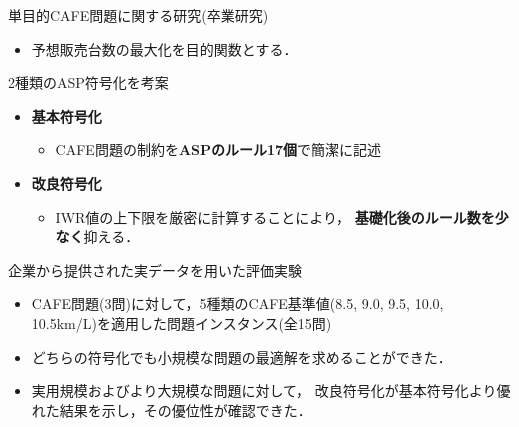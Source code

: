 \documentclass[dvipdfmx, 11pt]{beamer}
\begin{document}
\begin{frame}{単目的CAFE問題に関する研究(卒業研究)}
 \begin{itemize}
  \item 予想販売台数の最大化を目的関数とする．
 \end{itemize}
 \begin{block}{2種類のASP符号化を考案}
  \begin{itemize}
   \item {\bf 基本符号化}
	 \begin{itemize}
	  \item CAFE問題の制約を{\bf ASPのルール17個}で簡潔に記述
	 \end{itemize}
   \item {\bf 改良符号化}
	 \begin{itemize}
	  \item IWR値の上下限を厳密に計算することにより，
		{\bf 基礎化後のルール数を少なく}抑える．
	 \end{itemize}
  \end{itemize}
  \end{block}
 \begin{alertblock}{企業から提供された実データを用いた評価実験}
  \begin{itemize}
   \item CAFE問題(3問)に対して，5種類のCAFE基準値(8.5, 9.0, 9.5,
	 10.0, 10.5km/L)を適用した問題インスタンス(全15問)  
   \item どちらの符号化でも小規模な問題の最適解を求めることができた．
   \item 実用規模およびより大規模な問題に対して，
	 改良符号化が基本符号化より優れた結果を示し，その優位性が確認できた．
  \end{itemize}
 \end{alertblock}

\end{frame}
\end{document}
